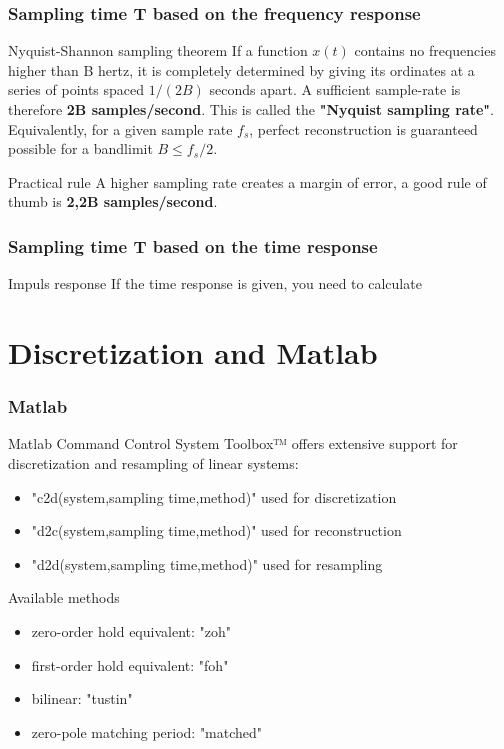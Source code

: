 \begin{frame}
	\frametitle{Sampling time T based on the frequency response}
	\begin{block}{Nyquist-Shannon sampling theorem}
		If a function $x(t)$ contains no frequencies higher than B hertz, it is completely determined by giving its ordinates at a series of points spaced $1/(2B)$ seconds apart. A sufficient sample-rate is therefore \textbf{2B samples/second}. This is called the \textbf{"Nyquist sampling rate"}. Equivalently, for a given sample rate $f_s$, perfect reconstruction is guaranteed possible for a bandlimit $B ≤ f_s/2$. 
	\end{block}
	\begin{block}{Practical rule}
		A higher sampling rate creates a margin of error, a good rule of thumb is \textbf{2,2B samples/second}.
	\end{block}
\end{frame}

\begin{frame}
	\frametitle{Sampling time T based on the time response}
	\begin{block}{Impuls response}
		If the time response is given, you need to calculate
	\end{block}
\end{frame}

\section{Discretization and Matlab}

\begin{frame}
	\frametitle{Matlab}
	\begin{block}{Matlab Command}
		Control System Toolbox™ offers extensive support for discretization and resampling of linear systems:
	\begin{itemize}
		\item "c2d(system,sampling time,method)" used for discretization
		\item "d2c(system,sampling time,method)" used for reconstruction
		\item "d2d(system,sampling time,method)" used for resampling
	\end{itemize}
	\end{block}
	
	\begin{block}{Available methods}
		\begin{itemize}
			\item zero-order hold equivalent: "zoh"
			\item first-order hold equivalent: "foh"
			\item bilinear: "tustin"
			\item zero-pole matching period: "matched"
		\end{itemize}
	\end{block}
\end{frame}

